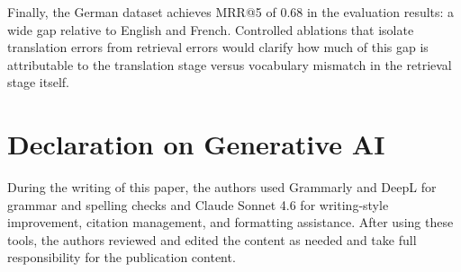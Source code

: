 Finally, the German dataset achieves MRR@5 of 0.68 in the evaluation results: a wide gap relative to English and French. Controlled ablations that isolate translation errors from retrieval errors would clarify how much of this gap is attributable to the translation stage versus vocabulary mismatch in the retrieval stage itself.


\section {Declaration on Generative AI}
During the writing of this paper, the authors used Grammarly and DeepL for grammar and spelling checks and Claude Sonnet 4.6 for writing-style improvement, citation management, and formatting assistance. After using these tools, the authors reviewed and edited the content as needed and take full responsibility for the publication content.